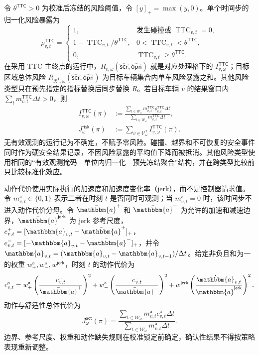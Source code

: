 \documentclass[10pt,a4paper,twocolumn]{article}
\begin{document}
令 $\theta^{\mathsf{TTC}}>0$ 为校准后冻结的风险阈值，令 $[y]_+=\max(y,0)$。单个时间步的归一化风险暴露为
\begin{equation*}
\rho_{v,t}^{\mathsf{TTC}}=
\begin{cases}
1,&\text{发生碰撞或 }\operatorname{TTC}_{v,t}=0,\\
1-\operatorname{TTC}_{v,t}/\theta^{\mathsf{TTC}},
&0<\operatorname{TTC}_{v,t}<\theta^{\mathsf{TTC}},\\
0,&\operatorname{TTC}_{v,t}\geq\theta^{\mathsf{TTC}}.
\end{cases}
\end{equation*}
在采用 TTC 主终点的运行中，$R_{v,\omega}(\hat{\mathsf{scr}},\hat{\mathsf{opn}})$ 就是对应处理格下的 $I_{v,\omega}^{\mathsf{TTC}}$；目标区域总体风险 $R_{\mathcal R^{\mathsf T},\omega}(\hat{\mathsf{scr}},\hat{\mathsf{opn}})$ 为目标车辆集合内单车风险暴露之和。其他风险类型只在预先指定的指标替换后同步替换 $R$。若目标车辆 $v$ 的结果窗口内 $\sum_t m_{v,t}^{\mathsf{TTC}}\Delta t>0$，则
\begin{equation*}
\begin{aligned}
I_{v,\omega}^{\mathsf{TTC}}(\pi)
&:=\frac{\sum_{t\in\mathcal W_\omega}m_{v,t}^{\mathsf{TTC}}
\rho_{v,t}^{\mathsf{TTC}}\Delta t}
{\sum_{t\in\mathcal W_\omega}m_{v,t}^{\mathsf{TTC}}\Delta t},\\
J_{\omega}^{\mathsf{risk}}(\pi)
&:=\sum_{v\in\mathcal V^{\mathsf T}_{\omega}}I_{v,\omega}^{\mathsf{TTC}}(\pi).
\end{aligned}
\end{equation*}
无有效观测的运行记为不确定，不赋予零风险。碰撞、越界和不可恢复的安全事件同时作为硬安全结果记录，不因风险暴露的平均值下降而被抵消。其他风险类型使用相同的“有效观测掩码—单位内归一化—预先冻结聚合”结构，并在跨类型比较前只比较标准化效应。

动作代价使用实际执行的加速度和加速度变化率（jerk），而不是控制器请求值。令 $m_{v,t}^{\mathsf a}\in\{0,1\}$ 表示二者在时刻 $t$ 是否同时可观测；当 $m_{v,t}^{\mathsf a}=0$ 时，该时间步不进入动作代价分母。令 $\bar{\mathbbm{a}}^{+}$ 和 $\bar{\mathbbm{a}}^{-}$ 为允许的加速和减速边界，$\bar{\mathbbm{a}}^{\mathsf{jerk}}$ 为 jerk 参考尺度，$e_{v,t}^{+}=[\mathbbm{a}_{v,t}-\bar{\mathbbm{a}}^{+}]_+$，$e_{v,t}^{-}=[-\mathbbm{a}_{v,t}-\bar{\mathbbm{a}}^{-}]_+$，并令 $\dot{\mathbbm{a}}_{v,t}=(\mathbbm{a}_{v,t}-\mathbbm{a}_{v,t-1})/\Delta t$。给定非负且和为一的权重 $w_{+}^{\mathsf a},w_{-}^{\mathsf a},w^{\mathsf{jerk}}$，时刻 $t$ 的动作代价为
\begin{equation*}
c_{v,t}^{\mathsf a}=
w_{+}^{\mathsf a}\left(\frac{e_{v,t}^{+}}{\bar{\mathbbm{a}}^{+}}\right)^2+
w_{-}^{\mathsf a}\left(\frac{e_{v,t}^{-}}{\bar{\mathbbm{a}}^{-}}\right)^2+
w^{\mathsf{jerk}}\left(\frac{\dot{\mathbbm{a}}_{v,t}}{\bar{\mathbbm{a}}^{\mathsf{jerk}}}\right)^2.
\end{equation*}
动作与舒适性总体代价为
\begin{equation*}
J_{\omega}^{\mathsf{act}}(\pi)
=\frac{\sum_{t\in\mathcal W_\omega}m_{v,t}^{\mathsf a}
c_{v,t}^{\mathsf a}\Delta t}
{\sum_{t\in\mathcal W_\omega}m_{v,t}^{\mathsf a}\Delta t}.
\end{equation*}
边界、参考尺度、权重和动作缺失规则在校准锁定前确定，确认性结果不得按策略表现重新调整。
\end{document}
